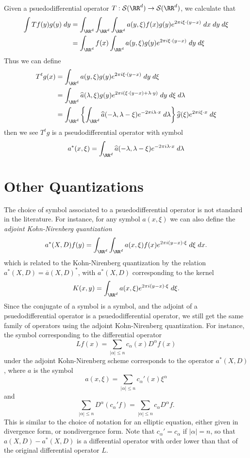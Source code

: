 Given a psuedodifferential operator $T: \mathcal{S}(\RR^d) \to \mathcal{S}(\RR^d)$, we calculate that
%
\begin{align*}
    \int Tf(y) g(y)\; dy &= \int_{\RR^d} \int_{\RR^d} \int_{\RR^d} a(y,\xi) f(x) g(y) e^{2 \pi i \xi \cdot (y-x)}\; dx\; dy\; d\xi\\
    &= \int_{\RR^d} f(x) \int_{\RR^d} a(y,\xi) g(y) e^{2 \pi i \xi \cdot (y-x)}\; dy\; d\xi
\end{align*}
%
Thus we can define
%
\begin{align*}
    T^t g(x) &= \int_{\RR^d} a(y,\xi) g(y) e^{2 \pi i \xi \cdot (y - x)}\; dy\; d\xi\\
    &= \int_{\RR^d} \widehat{a}(\lambda,\xi) g(y) e^{2 \pi i(\xi \cdot (y - x) + \lambda \cdot y)}\; dy\; d\xi\; d\lambda\\
    &= \int_{\RR^d} \left\{ \int_{\RR^d} \widehat{a}(-\lambda,\lambda-\xi) e^{-2 \pi i \lambda \cdot x}\; d\lambda \right\} \widehat{g}(\xi) e^{2 \pi i \xi \cdot x}\; d\xi
\end{align*}
%
then we see $T^t g$ is a pseudodifferential operator with symbol
%
\[ a^*(x,\xi) = \int_{\RR^d} \widehat{a}(-\lambda,\lambda-\xi) e^{-2 \pi i \lambda \cdot x}\; d\lambda \]

\section{Other Quantizations}

The choice of symbol associated to a psuedodifferential operator is not standard in the literature. For instance, for any symbol $a(x,\xi)$ we can also define the \emph{adjoint Kohn-Nirenberg quantization}
%
\[ a^*(X,D) f(y) = \int_{\RR^d} \int_{\RR^d} a(x,\xi) f(x) e^{2 \pi i (y - x) \cdot \xi}\; d\xi\; dx. \]
%
which is related to the Kohn-Nirenberg quantization by the relation $a^*(X,D) = \overline{a}(X,D)^*$, with $a^*(X,D)$ corresponding to the kernel
%
\[ K(x,y) = \int_{\RR^d} a(x,\xi) e^{2 \pi i (y - x) \cdot \xi}\; d\xi. \]
%
Since the conjugate of a symbol is a symbol, and the adjoint of a psuedodifferential operator is a psuedodifferential operator, we still get the same family of operators using the adjoint Kohn-Nirenberg quantization. For instance, the symbol corresponding to the differential operator
%
\[ Lf(x) = \sum_{|\alpha| \leq n} c_\alpha(x) D^\alpha f(x) \]
%
under the adjoint Kohn-Nirenberg scheme corresponds to the operator $a^*(X,D)$, where $a$ is the symbol
%
\[ a(x,\xi) = \sum_{|\alpha| \leq n} c_\alpha'(x) \xi^\alpha \]
%
and
%
\[ \sum_{|\alpha| \leq n} D^\alpha (c_\alpha' f) = \sum_{|\alpha| \leq n} c_\alpha D^\alpha f. \]
%
This is similar to the choice of notation for an elliptic equation, either given in divergence form, or nondivergence form. Note that $c_\alpha' = c_\alpha$ if $|\alpha| = n$, so that $a(X,D) - a^*(X,D)$ is a differential operator with order lower than that of the original differential operator $L$.

